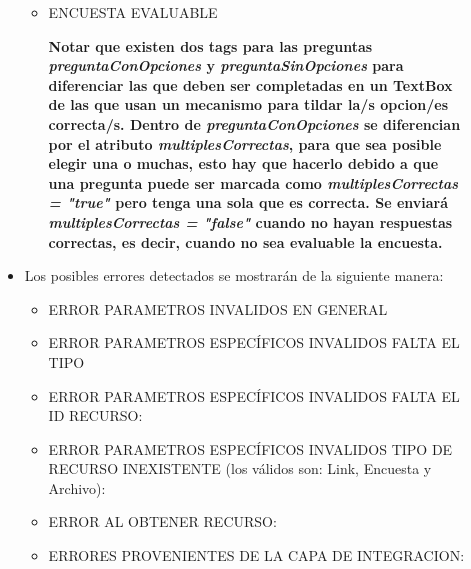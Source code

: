 \documentclass{article}
\begin{document}
\begin{description}
\begin{itemize}
\begin{itemize}
			
			
			\item ENCUESTA EVALUABLE
									
			
\textbf{Notar que existen dos tags para las preguntas \emph{preguntaConOpciones} y \emph{preguntaSinOpciones} para diferenciar las que deben ser completadas en un TextBox de las que usan un mecanismo para tildar la/s opcion/es correcta/s. Dentro de \emph{preguntaConOpciones} se diferencian por el atributo \textit{multiplesCorrectas}, para que sea posible elegir una o muchas, esto hay que hacerlo debido a que una pregunta puede ser marcada como \textit{multiplesCorrectas = "true"} pero tenga una sola que es correcta.\newline
Se enviar\'a \textit{multiplesCorrectas = "false"} cuando no hayan respuestas correctas, es decir, cuando no sea evaluable la encuesta.  } \newline
		
		\end{itemize}
\clearpage
			\item Los posibles errores detectados se mostrar\'an de la siguiente manera:
			\begin{itemize}
				\item ERROR PARAMETROS INVALIDOS EN GENERAL
				
				
				
				\item ERROR PARAMETROS ESPEC\'IFICOS INVALIDOS FALTA EL TIPO
				
						
								
				\item ERROR PARAMETROS ESPEC\'IFICOS INVALIDOS FALTA EL ID RECURSO:
				
					
				
				\item ERROR PARAMETROS ESPEC\'IFICOS INVALIDOS TIPO DE RECURSO INEXISTENTE (los v\'alidos son: Link, Encuesta y Archivo):
				
								
				
				\item ERROR AL OBTENER RECURSO:
				
				
				
				\item ERRORES PROVENIENTES DE LA CAPA DE INTEGRACION:
				

\end{itemize}
\end{itemize}
\end{description}
\end{document}
